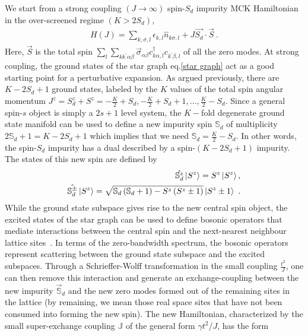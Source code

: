 \documentclass{iopart}
\begin{document}
We start from a strong coupling \((J \to \infty)\) spin-\(S_{d}\) impurity MCK Hamiltonian in the over-screened regime \(\left( K > 2S_{d} \right) \),
\begin{eqnarray}
	\label{strong_ham}
	H(J) = \sum_{k,\sigma,l}\epsilon_{k,l} \hat n_{k\sigma,l} + J \vec{S_d}\cdot\vec{S}~.
\end{eqnarray}
Here, \(\vec S\) is the total spin \(\sum_l \sum_{kk^\prime \alpha\beta} \vec \sigma_{\alpha\beta}c^\dagger_{k\alpha,l}c_{k^\prime\beta,l}\) of all the zero modes. At strong coupling, the ground states of the star graph eq.\eqref{star graph} act as a good starting point for a perturbative expansion. As argued previously, there are \(K-2S_d+1\) ground states, labeled by the \(K\) values of the total spin angular momentum \(J^z = S_d^z + S^z = -\frac{K}{2} + S_d, -\frac{K}{2} + S_d + 1, \ldots, \frac{K}{2} - S_d\). Since a general spin-\(s\) object is simply a \(2s+1\) level system, the \(K-\)fold degenerate ground state manifold can be used to define a new impurity spin \(\mathbb{S}_d\) of multiplicity \(2\mathbb{S}_d + 1 = K-2S_d+1\) which implies that we need \(\mathbb{S}_d = \frac{K}{2} - S_d\). In other words, the spin-\(S_d\) impurity has a dual described by a spin-\((K-2S_d+1)\) impurity. The states of this new spin are defined by
\begin{eqnarray}
	\hat{\mathbb{S}_d^z} \ket{S^z} = S^z \ket{S^z},\nonumber\\
	\hat{\mathbb{S}_d^\pm} \ket{S^z} = \sqrt{\mathbb{S}_d\left( \mathbb{S}_d + 1 \right) - S^z\left( S^z \pm 1\right)} \ket{S^z \pm 1}~.
\end{eqnarray}
While the ground state subspace gives rise to the new central spin object, the excited states of the star graph can be used to define bosonic operators that mediate interactions between the central spin and the next-nearest neighbour lattice sites~\cite{kroha_kolf_2007}. In terms of the zero-bandwidth spectrum, the bosonic operators represent scattering between the ground state subspace and the excited subspaces. Through a Schrieffer-Wolff transformation in the small coupling \(\frac{t^2}{J}\), one can then remove this interaction and generate an exchange-coupling between the new impurity \(\vec {\mathbb{S}}_d\) and the new zero modes formed out of the remaining sites in the lattice \cite{kroha_kolf_2007} (by remaining, we mean those real space sites that have not been consumed into forming the new spin). The new Hamiltonian, characterized by the small super-exchange  coupling \(\mathbb{J}\) of the general form \(\gamma t^2/J\), has the form
\end{document}
